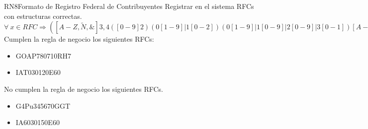 \begin{BussinesRule}{RN8}{Formato de Registro Federal de Contribuyentes }
	\BRitem[Motivación:] Registrar en el sistema RFCs con estructuras correctas.
	\BRitem[Sentencia:]  $\forall\ x \in RFC \Rightarrow   ([A-Z,\tilde{N},\&]{3,4}([0-9]{2})(0[1-9]|1[0-2])(0[1-9]|1[0-9]|2[0-9]|3[0-1])[A-Z0-9]{3})$
	 Cumplen la regla de negocio los siguientes RFCs:
        \begin{itemize}
			\item GOAP780710RH7
			\item IAT030120E60
        \end{itemize}
	 No cumplen la regla de negocio los siguientes RFCs.
		\begin{itemize}
        	\item G4Pu345670GGT
			\item IA6030150E60
        	
    \end{itemize}
\end{BussinesRule}




